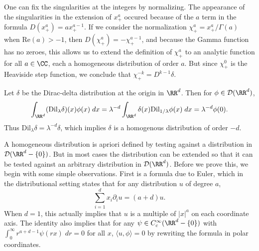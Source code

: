 \begin{example}
    One can fix the singularities at the integers by normalizing. The appearance of the singularities in the extension of $x^a_+$ occured because of the $a$ term in the formula $D(x^a_+) = a x^{a-1}_+$. If we consider the normalization $\chi^a_+ = x^a_+ / \Gamma(a)$ when $\text{Re}(a) > -1$, then $D(\chi^a_+) = - \chi^{a-1}_+$, and because the Gamma function has no zeroes, this allows us to extend the definition of $\chi^a_+$ to an analytic function for all $a \in \CC$, each a homogeneous distribution of order $a$. But since $\chi^0_+$ is the Heaviside step function, we conclude that $\chi^{-k}_+ = D^{k-1} \delta$.
\end{example}

\begin{example}
  Let $\delta$ be the Dirac-delta distribution at the origin in $\RR^d$. Then for $\phi \in \mathcal{D}(\RR^d)$,
  \begin{align*}
    \int_{\RR^d} (\text{Dil}_\lambda \delta)(x) \phi(x)\; dx = \lambda^{-d} \int_{\RR^d} \delta(x) \text{Dil}_{1/\lambda} \phi(x)\; dx = \lambda^{-d} \phi(0).
  \end{align*}
  Thus $\text{Dil}_\lambda \delta = \lambda^{-d} \delta$, which implies $\delta$ is a homogenous distribution of order $-d$.
\end{example}

A homogeneous distribution is apriori defined by testing against a distribution in $\mathcal{D}(\RR^d - \{ 0 \})$. But in most cases the distribution can be extended so that it can be tested against an arbitrary distribution in $\mathcal{D}(\RR^d)$. Before we prove this, we begin with some simple observations. First is a formula due to Euler, which in the distributional setting states that for any distribution $u$ of degree $a$,
%
\[ \sum_{i = 1}^d x_i \partial_i u = (a + d) u. \]
%
When $d = 1$, this actually implies that $u$ is a multiple of $|x|^a$ on each coordinate axis. The identity also implies that for any $\psi \in C_c^\infty(\RR^d - \{ 0 \})$ with $\int_0^\infty r^{a + d-1} \psi(rx)\; dr = 0$ for all $x$, $\langle u, \phi \rangle = 0$ by rewriting the formula in polar coordinates.

